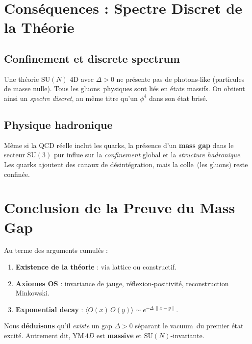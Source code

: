 \vspace{1em}

\section{Conséquences : Spectre Discret de la Théorie}
\label{sec:10.4}

\subsection*{Confinement et discrete spectrum}
Une théorie \(\mathrm{SU}(N)\) 4D avec \(\Delta>0\) ne présente pas de photons-like (particules de masse nulle). Tous les \og gluons\fg\ physiques sont liés en états massifs. On obtient ainsi un \emph{spectre discret}, au même titre qu’un \(\phi^4\) dans son état brisé.

\subsection*{Physique hadronique}
Même si la QCD réelle inclut les quarks, la présence d’un \textbf{mass gap} dans le secteur \(\mathrm{SU}(3)\) pur influe sur la \emph{confinement} global et la \emph{structure hadronique}. Les quarks ajoutent des canaux de désintégration, mais la \og colle\fg\ (les gluons) reste confinée.

\vspace{1em}

\section{Conclusion de la Preuve du Mass Gap}
\label{sec:10.5}

Au terme des arguments cumulés :
\begin{enumerate}
	\item \textbf{Existence de la théorie} : via lattice ou constructif.  
	\item \textbf{Axiomes OS} : invariance de jauge, réflexion-positivité, reconstruction Minkowski.  
	\item \textbf{Exponential decay} : \(\langle O(x)\,O(y)\rangle\sim e^{-\Delta\,\|x-y\|}\).  
\end{enumerate}
Nous \textbf{déduisons} qu’il \emph{existe} un gap \(\Delta>0\) séparant le \og vacuum\fg\ du premier état excité. Autrement dit, \(\mathrm{YM}\,4D\) est \textbf{massive} et \(\mathrm{SU}(N)\)-invariante.

